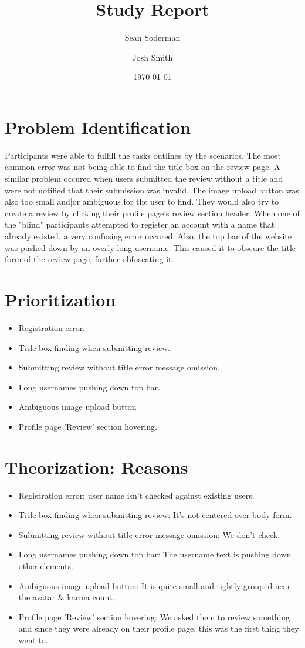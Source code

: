 \documentclass[11pt]{extarticle}
\begin{document}
\title{Study Report}
\author{Sean Soderman\\
      \and
      Josh Smith
}
\date{\today}
\maketitle

\section*{Problem Identification}
Participants were able to fulfill the tasks outlines by the scenarios. The most common error was not being able to
find the title box on the review page. A similar problem occured when users submitted the review without a title
and were not notified that their submission was invalid. The image upload button was also too small and|or ambiguous
for the user to find. They would also try to create a review by clicking their profile page's review section
header. When one of the "blind" participants attempted to register an account with a name that already existed,
a very confusing error occured. Also, the top bar of the website was pushed down by an overly long username. This
caused it to obscure the title form of the review page, further obfuscating it.
\section*{Prioritization}
\begin{itemize}
\item Registration error.
\item Title box finding when submitting review.
\item Submitting review without title error message omission.
\item Long usernames pushing down top bar.
\item Ambiguous image upload button
\item Profile page 'Review' section hovering.
\end{itemize}
\section*{Theorization: Reasons}
\begin{itemize}
\item Registration error: user name isn't checked against existing users.
\item Title box finding when submitting review: It's not centered over body form.
\item Submitting review without title error message omission: We don't check.
\item Long usernames pushing down top bar: The username text is pushing down other elements.
\item Ambiguous image upload button: It is quite small and tightly grouped near the avatar \& karma count.
\item Profile page 'Review' section hovering: We asked them to review something and since they were already on their
profile page, this was the first thing they went to.
\end{itemize}
\end{document}
